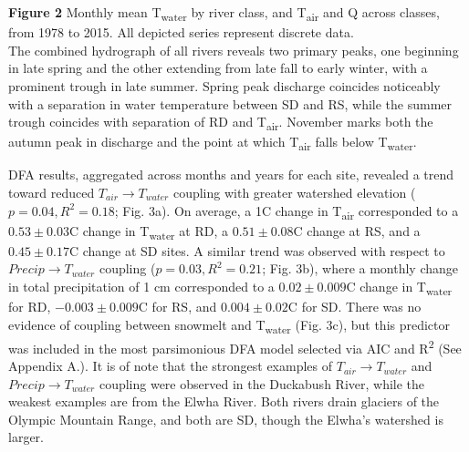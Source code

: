 \documentclass[notitlepage]{article}
\begin{document}
\textbf{Figure 2} Monthly mean T\textsubscript{water} by river class, and T\textsubscript{air} and Q across classes, from 1978 to 2015. All depicted series represent discrete data. \setlength{\parskip}{6pt}\\[\baselineskip]

The combined hydrograph of all rivers reveals two primary peaks, one beginning in late spring and the other extending from late fall to early winter, with a prominent trough in late summer. Spring peak discharge coincides noticeably with a separation in water temperature between SD and RS, while the summer trough coincides with separation of RD and T\textsubscript{air}. November marks both the autumn peak in discharge and the point at which T\textsubscript{air} falls below T\textsubscript{water}.

\sloppy
DFA results, aggregated across months and years for each site, revealed a trend toward reduced $T_{air}\rightarrow T_{water}$ coupling with greater watershed elevation ($p=0.04, R^2=0.18$; Fig. 3a). On average, a 1\degree C change in T\textsubscript{air} corresponded to a $0.53\pm 0.03$\degree C change in T\textsubscript{water} at RD, a $0.51\pm 0.08$\degree C change at RS, and a $0.45\pm 0.17$\degree C change at SD sites. A similar trend was observed with respect to $Precip\rightarrow T_{water}$ coupling ($p=0.03, R^2=0.21$; Fig. 3b), where a monthly change in total precipitation of 1 cm corresponded to a $0.02\pm 0.009$\degree C change in T\textsubscript{water} for RD, $-0.003\pm 0.009$\degree C for RS, and $0.004\pm 0.02$\degree C for SD. There was no evidence of coupling between snowmelt and T\textsubscript{water} (Fig. 3c), but this predictor was included in the most parsimonious DFA model selected via AIC and R\textsuperscript{2} (See Appendix A.). It is of note that the strongest examples of $T_{air}\rightarrow T_{water}$ and $Precip\rightarrow T_{water}$ coupling were observed in the Duckabush River, while the weakest examples are from the Elwha River. Both rivers drain glaciers of the Olympic Mountain Range, and both are SD, though the Elwha's watershed is larger.
\end{document}
